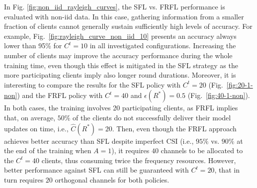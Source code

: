 \documentclass[10pt, conference, letterpaper]{IEEEtran}
\begin{document}
	In Fig. \ref{fig:non_iid_rayleigh_curves}, the SFL vs. FRFL performance is evaluated with non-\gls{iid} data. 
	In this case, gathering information from a smaller fraction of clients cannot generally sustain sufficiently high levels of accuracy. For example, Fig.~\ref{fig:rayleigh_curve_non_iid_10} presents an accuracy always lower than 95\% for $C^t=10$ in all investigated configurations.
	Increasing the number of clients may improve the accuracy performance during the whole training time, even though this effect is mitigated in the SFL strategy as the more participating clients imply also longer round durations.
	Moreover, it is interesting to compare the results for the SFL policy with $C^t=20$ (Fig.~\ref{fig:20-1-non}) and the FRFL policy with $C^t=40$ and $\epsilon(R^*) = 0.5$ (Fig.~\ref{fig:40-1-non}). 
	In both cases, the training involves 20 participating clients, as FRFL implies that, on average, $50\%$ of the clients do not successfully deliver their model updates on time, i.e., $\hat{C}(R^*)=20$. Then, even though the FRFL approach achieves better accuracy than SFL despite imperfect CSI (i.e., $95\%$ vs. $90\%$ at the end of the training when $A=1$), it requires $40$ channels to be allocated to the  $C^t=40$ clients, thus consuming twice the frequency resources. However, better performance against SFL can still be guaranteed with $C^t = 20$, that in turn requires $20$ orthogonal channels for both policies.
	
	
	
\end{document}
